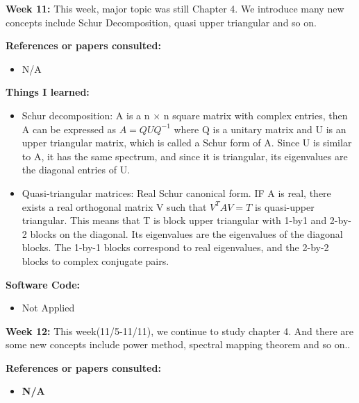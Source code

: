 \documentclass{article}
\begin{document}
\newpage
\textbf{Week 11:}
This week, major topic was still Chapter 4. We introduce many new concepts include Schur Decomposition, quasi upper triangular and so on.

\textbf{References or papers consulted:}
\begin{itemize}

\item N/A

\end{itemize}

\textbf{Things I learned:}
\begin{itemize}
\item Schur decomposition: A is a n × n square matrix with complex entries, then A can be expressed as  $A = Q U Q^{-1}$ where Q is a unitary matrix and U is an upper triangular matrix, which is called a Schur form of A. Since U is similar to A, it has the same spectrum, and since it is triangular, its eigenvalues are the diagonal entries of U.
\item Quasi-triangular matrices: Real Schur canonical form. IF A is real, there exists a real orthogonal matrix V such that $V^T A V = T$ is quasi-upper triangular. This means that T is block upper triangular with 1-by1 and 2-by-2 blocks on the diagonal. Its eigenvalues are the eigenvalues of the diagonal blocks. The 1-by-1 blocks correspond to real eigenvalues, and the 2-by-2 blocks to complex conjugate pairs.
\end{itemize}
\textbf{Software Code:}
\begin{itemize}
\item  Not Applied
\end{itemize}

\newpage
\textbf{Week 12:}
This week(11/5-11/11),  we continue to study chapter 4. And there are some new concepts include power method, spectral mapping theorem and so on..

\textbf{References or papers consulted:}
\begin{itemize}

\item \textbf{N/A}

\end{itemize}
\end{document}
